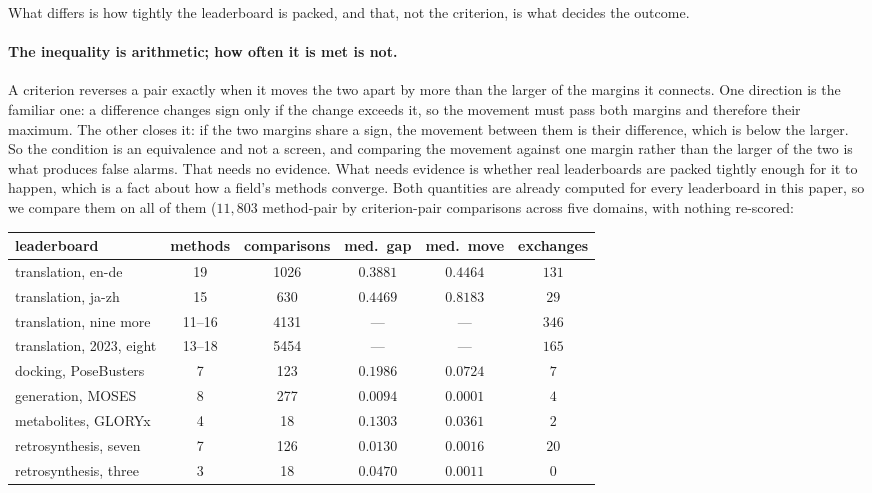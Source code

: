 What differs is how tightly the leaderboard is packed, and that, not the criterion, is
what decides the outcome.

\paragraph{The inequality is arithmetic; how often it is met is not.} A criterion reverses a pair
exactly when it moves the two apart by more than the larger of the margins it connects. One
direction is the familiar one: a difference changes sign only if the change exceeds it, so the
movement must pass both margins and therefore their maximum. The other closes it: if the two
margins share a sign, the movement between them is their difference, which is below the larger. So
the condition is an equivalence and not a screen, and comparing the movement against one margin
rather than the larger of the two is what produces false alarms. That needs no evidence. What needs evidence is whether real
leaderboards are packed tightly enough for it to happen, which is a fact about how a field's methods
converge. Both quantities are already computed for every leaderboard in this paper, so we compare
them on all of them ($11{,}803$ method-pair by criterion-pair comparisons across five domains, with
nothing re-scored:

\begin{center}
\footnotesize
\begin{tabular}{lccccc}
\toprule
leaderboard & methods & comparisons & med.\ gap & med.\ move & exchanges \\
\midrule
translation, en-de         & 19 & 1026  & $0.3881$ & $0.4464$ & $131$ \\
translation, ja-zh         & 15 & 630   & $0.4469$ & $0.8183$ & $29$ \\
translation, nine more     & 11--16 & 4131  & --- & --- & $346$ \\
translation, 2023, eight   & 13--18 & 5454  & --- & --- & $165$ \\
docking, PoseBusters       & 7 & 123   & $0.1986$ & $0.0724$ & $7$ \\
generation, MOSES          & 8 & 277   & $0.0094$ & $0.0001$ & $4$ \\
metabolites, GLORYx        & 4 & 18    & $0.1303$ & $0.0361$ & $2$ \\
retrosynthesis, seven      & 7 & 126   & $0.0130$ & $0.0016$ & $20$ \\
retrosynthesis, three      & 3 & 18    & $0.0470$ & $0.0011$ & $0$ \\
\bottomrule
\end{tabular}
\end{center}

